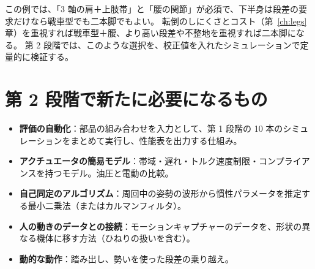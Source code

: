 この例では、「3 軸の肩＋上肢帯」と「腰の関節」が必須で、下半身は段差の要求だけなら戦車型でも二本脚でもよい。
転倒のしにくさとコスト（第~\ref{ch:legs}章）を重視すれば戦車型＋腰、より高い段差や不整地を重視すれば二本脚になる。
第 2 段階では、このような選択を、校正値を入れたシミュレーションで定量的に検証する。

\section{第 2 段階で新たに必要になるもの}

\begin{itemize}
\item \textbf{評価の自動化}：部品の組み合わせを入力として、第 1 段階の 10 本のシミュレーションをまとめて実行し、性能表を出力する仕組み。
\item \textbf{アクチュエータの簡易モデル}：帯域・遅れ・トルク速度制限・コンプライアンスを持つモデル。油圧と電動の比較。
\item \textbf{自己同定のアルゴリズム}：周回中の姿勢の波形から慣性パラメータを推定する最小二乗法（またはカルマンフィルタ）。
\item \textbf{人の動きのデータとの接続}：モーションキャプチャーのデータを、形状の異なる機体に移す方法（ひねりの扱いを含む）。
\item \textbf{動的な動作}：踏み出し、勢いを使った段差の乗り越え。
\end{itemize}
